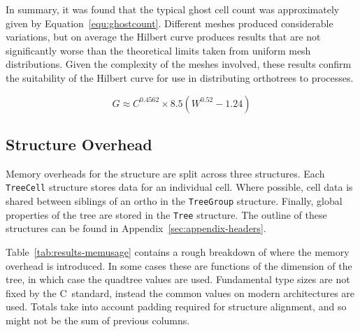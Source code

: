 \documentclass[twoside]{IIBproject}
\def\CC{{C\nolinebreak[4]\hspace{-.05em}\raisebox{.4ex}{\tiny\bf ++}}}
\numberwithin{figure}{section}
\begin{document}
        In summary, it was found that the typical ghost cell count was approximately given by Equation~\ref{equ:ghostcount}. Different meshes produced considerable variations, but on average the Hilbert curve produces results that are not significantly worse than the theoretical limits taken from uniform mesh distributions. Given the complexity of the meshes involved, these results confirm the suitability of the Hilbert curve for use in distributing orthotrees to processes.

        \begin{equation}
            G \approx C^{0.4562} \times 8.5(W^{0.52}-1.24)
            \label{equ:ghostcount}
        \end{equation}



    \subsection{Structure Overhead} %
        \label{sec:results-memoryuse}

        Memory overheads for the structure are split across three structures. Each \texttt{TreeCell} structure stores data for an individual cell. Where possible, cell data is shared between siblings of an ortho in the \texttt{TreeGroup} structure. Finally, global properties of the tree are stored in the \texttt{Tree} structure. The outline of these structures can be found in Appendix~\ref{sec:appendix-headers}.

        Table~\ref{tab:results-memusage} contains a rough breakdown of where the memory overhead is introduced. In some cases these are functions of the dimension of the tree, in which case the quadtree values are used. Fundamental type sizes are not fixed by the \CC~standard, instead the common values on modern architectures are used. Totals take into account padding required for structure alignment, and so might not be the sum of previous columns.
\end{document}
